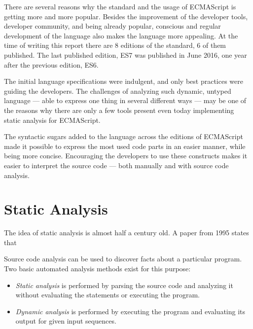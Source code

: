 There are several reasons why the standard and the usage of ECMAScript is getting more and more popular. Besides the improvement of the developer tools, developer community, and being already popular, conscious and regular development of the language also makes the language more appealing. At the time of writing this report there are 8 editions of the standard, 6 of them published. The last published edition, ES7 was published in June 2016, one year after the previous edition, ES6.

The initial language specifications were indulgent, and only best practices were guiding the developers. The challenges of analyzing such dynamic, untyped language --- able to express one thing in several different ways --- may be one of the reasons why there are only a few tools present even today implementing static analysis for ECMAScript.

The syntactic sugars added to the language across the editions of ECMAScript made it possible to express the most used code parts in an easier manner, while being more concise. Encouraging the developers to use these constructs makes it easier to interpret the source code --- both manually and with source code analysis.



\section{Static Analysis}
The idea of static analysis is almost half a century old. A paper from 1995 states that 

Source code analysis can be used to discover facts about a particular program. Two basic automated analysis methods exist for this purpose:
\begin{itemize}[topsep=0pt]
  \item \emph{Static analysis} is performed by parsing the source code and analyzing it without evaluating the statements or executing the program.
  \item \emph{Dynamic analysis} is performed by executing the program and evaluating its output for given input sequences.
\end{itemize}

